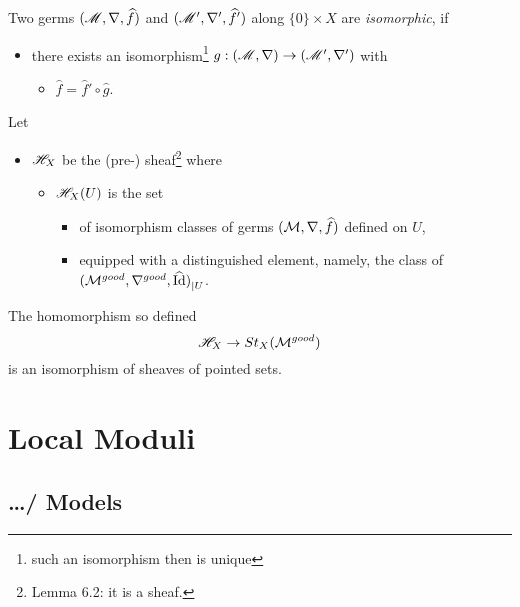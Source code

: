 \begin{defn}
  Two germs $(\mathscr{M},\nabla,\widehat f)$ and $(\mathscr{M}',\nabla',\widehat f')$ along
  $\{0\}\times X$ are \emph{isomorphic}, if
  \begin{itemize}
    \item there exists an isomorphism\footnote{such an isomorphism then is
      unique} $g:(\mathscr{M},\nabla)\to(\mathscr{M}',\nabla')$ with
      \begin{itemize}
        \item $\hat f=\hat f'\circ\hat g$.
      \end{itemize}
  \end{itemize}
\end{defn}
Let
\begin{itemize}
  \item $\mathscr{H}_X$ be the (pre-) sheaf\footnote{Lemma 6.2: it is a sheaf.} where
    \begin{itemize}
      \item $\mathscr{H}_X(U)$ is the set
        \begin{itemize}
          \item of isomorphism classes of germs $(\mathcal{M},\nabla,\widehat f)$ defined
            on $U$,
          \item equipped with a distinguished element, namely, the class of
            ${(\mathcal{M}^{good},\nabla^{good},\widehat{\operatorname{Id}})}_{|U}$.
        \end{itemize}
    \end{itemize}
\end{itemize}
\begin{thm}
  The homomorphism so defined
  \[
    \mathscr{H}_X\to St_X(\mathcal{M}^{good})
  \]
  is an isomorphism of sheaves of pointed sets.
\end{thm}

\section{Local Moduli}
\subsection{\dots / Models}

